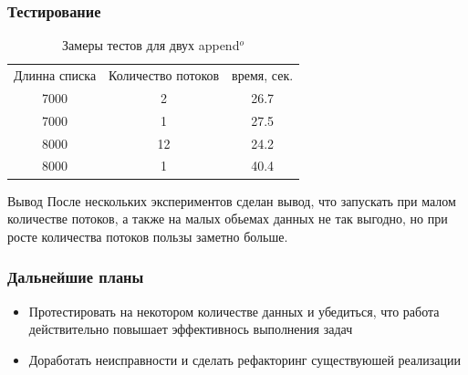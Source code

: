 \documentclass[aspectratio=169]{beamer}
\begin{document}
\begin{frame}
	\frametitle{Тестирование}
	\begin{table}
		\caption{Замеры тестов для двух append$^o$}
		\begin{tabular}{ccc}
			Длинна списка & Количество потоков & время, сек. \\%
			7000          & 2                  & 26.7        \\
			7000          & 1                  & 27.5        \\
			8000          & 12                 & 24.2        \\
			8000          & 1                  & 40.4        \\
		\end{tabular}
	\end{table}

	\begin{block}{Вывод}
		После нескольких экспериментов сделан вывод, что запускать при малом количестве потоков, а также на малых обьемах данных не так выгодно, но при росте количества потоков пользы заметно больше.
	\end{block}

\end{frame}

\begin{frame}[t]
	\frametitle{Дальнейшие планы}
	\begin{itemize}
		\item Протестировать на некотором количестве данных и убедиться, что
		      работа действительно повышает эффективнось выполнения задач
		\item Доработать неисправности и сделать рефакторинг существуюшей реализации
	\end{itemize}

\end{frame}
\end{document}
